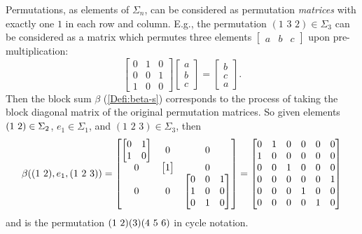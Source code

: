 \begin{remark}\label{rem:perm_matrices}
Permutations, as elements of $\Sigma_n$, can be considered as permutation \emph{matrices} with exactly one $1$ in each row and column. E.g., the permutation $(1 \,\, 3 \,\, 2) \in \Sigma_3$ can be considered as a matrix which permutes three elements $\begin{bmatrix} a & b & c \end{bmatrix}$ upon pre-multiplication:
  \[
  \begin{bmatrix}
  0 & 1 & 0 \\
  0 & 0 & 1 \\
  1 & 0 & 0
  \end{bmatrix}
  \begin{bmatrix}
  a \\ b \\ c
  \end{bmatrix}
  =
  \begin{bmatrix}
  b \\ c \\ a
  \end{bmatrix}.
  \]
Then the block sum $\beta$ (\cref{Defi:beta-s}) corresponds to the process of taking the block diagonal matrix of the original permutation matrices. So given elements $( 1 \, \, 2 ) \in \Sigma_2$, $e_1 \in \Sigma_1$, and $(1 \,\, 2 \,\, 3) \in \Sigma_3$, then
  \[
  \beta(( 1 \, \, 2 ),e_1,(1 \,\, 2 \,\, 3)) =
  \begin{bmatrix}
  \begin{bmatrix}
  0 & 1 \\
  1 & 0
  \end{bmatrix} & 0 & 0 \\
  0 & \begin{bmatrix} 1 \end{bmatrix} & 0 \\
  0 & 0 &   \begin{bmatrix}
  0 & 0 & 1 \\
  1 & 0 & 0 \\
  0 & 1 & 0
  \end{bmatrix}
  \end{bmatrix}
  =
  \begin{bmatrix}
  0 & 1 & 0 & 0 & 0 & 0 \\
  1 & 0 & 0 & 0 & 0 & 0 \\
  0 & 0 & 1 & 0 & 0 & 0 \\
  0 & 0 & 0 & 0 & 0 & 1 \\
  0 & 0 & 0 & 1 & 0 & 0 \\
  0 & 0 & 0 & 0 & 1 & 0 \\
  \end{bmatrix}
  \]
and is the permutation $( 1 \, \, 2 )(3)(4 \,\, 5 \,\, 6)$ in cycle notation.


\end{remark}
